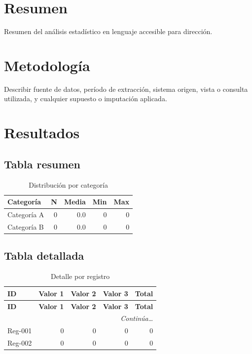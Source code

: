 \documentclass{../base/canon}
\begin{document}
\section{Resumen}

\begin{ParrafoEjecutivo}
Resumen del análisis estadístico en lenguaje accesible para dirección.
\end{ParrafoEjecutivo}

\section{Metodología}

\begin{ParrafoMetodologico}
Describir fuente de datos, período de extracción, sistema origen, vista o consulta
utilizada, y cualquier supuesto o imputación aplicada.
\end{ParrafoMetodologico}

\section{Resultados}

\subsection{Tabla resumen}

\begin{table}[H]
  \centering
  \caption{Distribución por categoría}
  \begin{tabular}{l r r r r}
    \toprule
    \textbf{Categoría} & \textbf{N} & \textbf{Media} & \textbf{Min} & \textbf{Max} \\
    \midrule
    Categoría A & 0 & 0.0 & 0 & 0 \\
    Categoría B & 0 & 0.0 & 0 & 0 \\
    \bottomrule
  \end{tabular}
\end{table}

\subsection{Tabla detallada}

\begin{center}
\begin{longtable}{@{} l r r r r @{}}
  \caption{Detalle por registro} \\
  \toprule
  \textbf{ID} & \textbf{Valor 1} & \textbf{Valor 2} & \textbf{Valor 3} & \textbf{Total} \\
  \midrule
  \endfirsthead
  \toprule
  \textbf{ID} & \textbf{Valor 1} & \textbf{Valor 2} & \textbf{Valor 3} & \textbf{Total} \\
  \midrule
  \endhead
  \midrule
  \multicolumn{5}{r}{\small\itshape Continúa\ldots} \\
  \endfoot
  \bottomrule
  \endlastfoot
  Reg-001 & 0 & 0 & 0 & 0 \\
  Reg-002 & 0 & 0 & 0 & 0 \\
\end{longtable}
\end{center}
\end{document}
